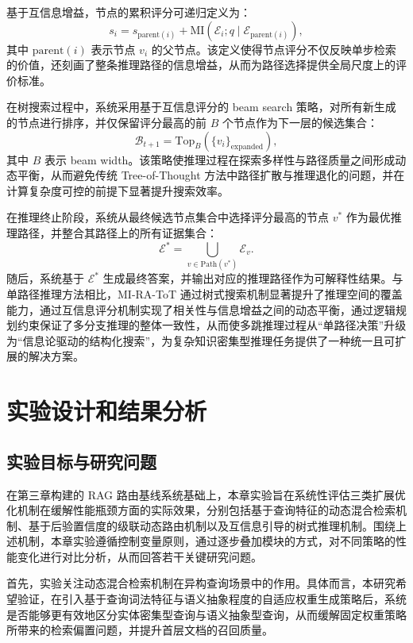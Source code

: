 基于互信息增益，节点的累积评分可递归定义为：
\begin{equation}
s_i = s_{\mathrm{parent}(i)} + \mathrm{MI}(\mathcal{E}_i; q \mid \mathcal{E}_{\mathrm{parent}(i)}),
\end{equation}
其中 $\mathrm{parent}(i)$ 表示节点 $v_i$ 的父节点。该定义使得节点评分不仅反映单步检索的价值，还刻画了整条推理路径的信息增益，从而为路径选择提供全局尺度上的评价标准。

在树搜索过程中，系统采用基于互信息评分的 beam search 策略，对所有新生成的节点进行排序，并仅保留评分最高的前 $B$ 个节点作为下一层的候选集合：
\begin{equation}
\mathcal{B}_{t+1} = \mathrm{Top}_B\left(\{v_i\}_{\text{expanded}}\right),
\end{equation}
其中 $B$ 表示 beam width。该策略使推理过程在探索多样性与路径质量之间形成动态平衡，从而避免传统 Tree-of-Thought 方法中路径扩散与推理退化的问题，并在计算复杂度可控的前提下显著提升搜索效率。

在推理终止阶段，系统从最终候选节点集合中选择评分最高的节点 $v^\ast$ 作为最优推理路径，并整合其路径上的所有证据集合：
\begin{equation}
\mathcal{E}^\ast = \bigcup_{v \in \mathrm{Path}(v^\ast)} \mathcal{E}_v.
\end{equation}
随后，系统基于 $\mathcal{E}^\ast$ 生成最终答案，并输出对应的推理路径作为可解释性结果。与单路径推理方法相比，MI-RA-ToT 通过树式搜索机制显著提升了推理空间的覆盖能力，通过互信息评分机制实现了相关性与信息增益之间的动态平衡，通过逻辑规划约束保证了多分支推理的整体一致性，从而使多跳推理过程从“单路径决策”升级为“信息论驱动的结构化搜索”，为复杂知识密集型推理任务提供了一种统一且可扩展的解决方案。

\section{实验设计和结果分析}

\subsection{实验目标与研究问题}

在第三章构建的 RAG 路由基线系统基础上，本章实验旨在系统性评估三类扩展优化机制在缓解性能瓶颈方面的实际效果，分别包括基于查询特征的动态混合检索机制、基于后验置信度的级联动态路由机制以及互信息引导的树式推理机制。围绕上述机制，本章实验遵循控制变量原则，通过逐步叠加模块的方式，对不同策略的性能变化进行对比分析，从而回答若干关键研究问题。

首先，实验关注动态混合检索机制在异构查询场景中的作用。具体而言，本研究希望验证，在引入基于查询词法特征与语义抽象程度的自适应权重生成策略后，系统是否能够更有效地区分实体密集型查询与语义抽象型查询，从而缓解固定权重策略所带来的检索偏置问题，并提升首层文档的召回质量。

